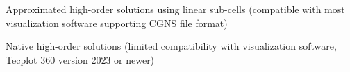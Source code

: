 \begin{overview}
\begin{overview}
      \begin{overview}
        \item Approximated high-order solutions using linear sub-cells
          (compatible with most visualization software supporting CGNS file
          format)
        \item Native high-order solutions (limited compatibility with
          visualization software, \forexample Tecplot 360 version 2023 or newer)
      \end{overview}
  \end{overview}
\end{overview}





